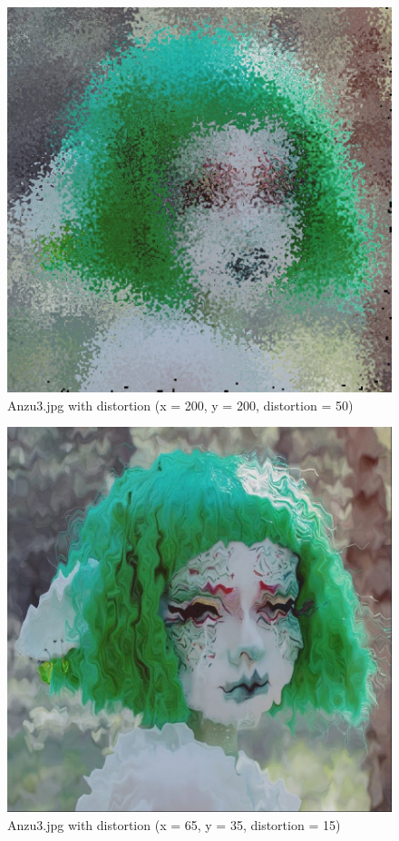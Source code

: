 \documentclass[12pt,a4paper]{article}
\begin{document}
    \begin{figure}[!ht]
        \centering
        \includegraphics[scale=0.5]{Anzu-glass.jpg}
        \caption{Anzu3.jpg with distortion (x = 200, y = 200, distortion = 50)}
        \label{Anzu-glass}
    \end{figure}

    \begin{figure}[!ht]
        \centering
        \includegraphics[scale=0.5]{Anzu-watery.jpg}
        \caption{Anzu3.jpg with distortion (x = 65, y = 35, distortion = 15)}
        \label{Anzu-watery}
    \end{figure}
\end{document}
